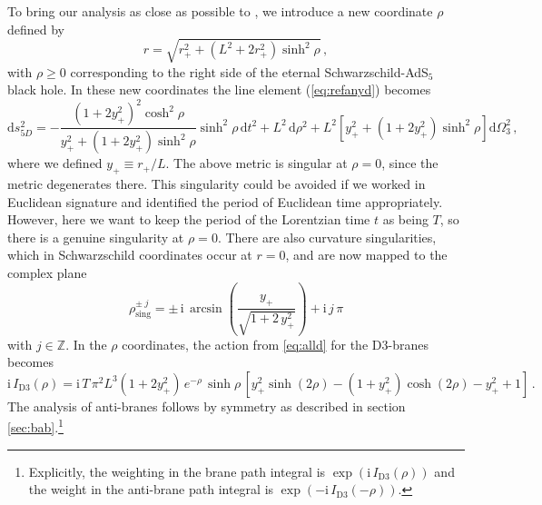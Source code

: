 \documentclass[11pt]{article}
\renewcommand{\i}{\mathrm{i}}
\begin{document}
To bring our analysis as close as possible to \cite{SSS-1}, we introduce a new coordinate $\rho$ defined by
\begin{equation}
r=\sqrt{r_+^2+(L^2+2 r_+^2)\sinh ^2\rho }\,,
\label{defrho}
\end{equation}
with $\rho\geq0$ corresponding to the right side of the eternal Schwarzschild-AdS$_5$ black hole. 
In these new coordinates the line element (\ref{eq:refanyd}) becomes
\begin{equation}
\mathrm{d}s^2_{5D} = -\frac{(1+2 y_+^2)^2 \cosh ^2\rho}{y_+^2+(1+2 y_+^2) \sinh ^2\rho} \sinh ^2\rho\,\mathrm{d}t^2+L^2\,\mathrm{d}\rho^2+L^2\left[y_+^2+ (1+2 y_+^2)\sinh ^2\rho\right]\mathrm{d}\Omega_3^2\,,
\label{eq:br}
\end{equation}
where we defined $y_+\equiv r_+/L$. 
The above metric is singular at $\rho=0$, since the metric degenerates there. 
This singularity could be avoided if we worked in Euclidean signature and identified the period of Euclidean time appropriately. 
However, here we want to keep the period of the Lorentzian time $t$ as being $T$, so there is a genuine singularity at $\rho=0$. 
There are also curvature singularities, which in Schwarzschild coordinates occur at $r=0$, and are now mapped to the complex plane
\begin{equation}
\rho^{\pm\;j}_{\mathrm{sing}} = \pm\,\i\,\arcsin\left(\frac{y_+}{\sqrt{1+2\,y_+^2}}\right)+\i\,j\,\pi
\end{equation}
with $j\in\mathbb{Z}$.
In the $\rho$ coordinates, the action from \eqref{eq:alld} for the D$3$-branes becomes
\begin{equation}
\i\,I_{\mathrm{D}3}(\rho) = \i\,T \,\pi ^2 L^3 (1+2 y_+^2)\, e^{-\rho }\, \sinh \rho\,\left[y_+^2 \sinh (2 \rho )-(1+y_+^2) \cosh (2 \rho )-y_+^2+1\right]\,.
\label{eq:actiond3rho}
\end{equation}
The analysis of anti-branes follows by symmetry as described in section \ref{sec:bab}.\footnote{
    Explicitly, the weighting in the brane path integral is $\exp(\i\,I_{\mathrm{D}3}(\rho))$ and the weight in the anti-brane path integral is $\exp( - \i\,I_{\mathrm{D}3}(-\rho))$.
}
\end{document}

